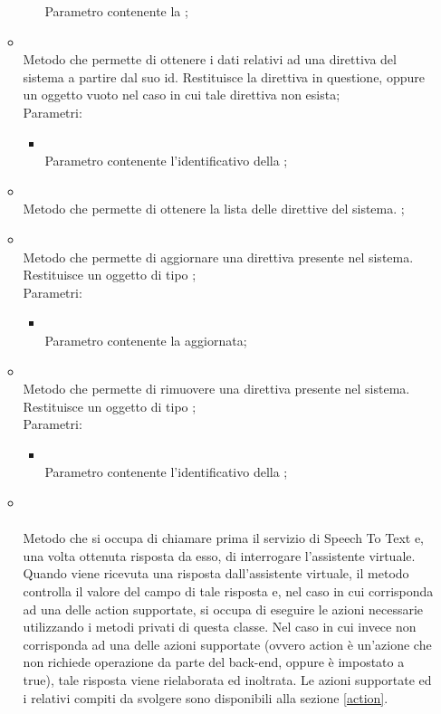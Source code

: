 \begin{itemize}
\begin{itemize}
\begin{itemize}
			Parametro contenente la ;
		\end{itemize}
		\item[]  \\		Metodo che permette di ottenere i dati relativi ad una direttiva del sistema a partire dal suo id. Restituisce la direttiva in questione, oppure un oggetto vuoto nel caso in cui tale direttiva non esista;\\
		Parametri:
		\begin{itemize}
			\item {} \\
			Parametro contenente l'identificativo della ;
		\end{itemize}
		\item[]  \\		Metodo che permette di ottenere la lista delle direttive del sistema.
;\\
		\item[]  \\		Metodo che permette di aggiornare una direttiva presente nel sistema. Restituisce un oggetto di tipo ;\\
		Parametri:
		\begin{itemize}
			\item {} \\
			Parametro contenente la  aggiornata;
		\end{itemize}
		\item[]  \\		Metodo che permette di rimuovere una direttiva presente nel sistema. Restituisce un oggetto di tipo ;\\
		Parametri:
		\begin{itemize}
			\item {} \\
			Parametro contenente l'identificativo della ;
		\end{itemize}
		\item[]  \\\\		Metodo che si occupa di chiamare prima il servizio di Speech To Text e, una volta ottenuta risposta da esso, di interrogare l'assistente virtuale. Quando viene ricevuta una risposta dall'assistente virtuale, il metodo controlla il valore del campo  di tale risposta e, nel caso in cui corrisponda ad una delle action supportate, si occupa di eseguire le azioni necessarie utilizzando i metodi privati di questa classe. Nel caso in cui invece  non corrisponda ad una delle azioni supportate (ovvero action è un'azione che non richiede operazione da parte del back-end, oppure  è impostato a true), tale risposta viene rielaborata ed inoltrata. Le azioni supportate ed i relativi compiti da svolgere sono disponibili alla sezione \ref{action}. \\

\end{itemize}
\end{itemize}
